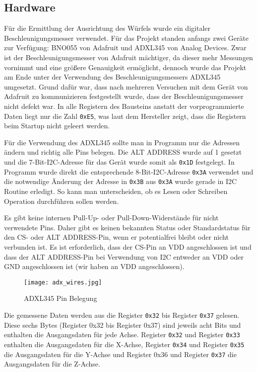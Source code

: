 
\subsection{Hardware}
Für die Ermittlung der Ausrichtung des Würfels wurde ein digitaler Beschleunigungsmesser verwendet. Für das Projekt standen anfangs zwei Geräte zur Verfügung: BNO055 von Adafruit und ADXL345 von Analog Devices. Zwar ist der Beschleunigungsmesser von Adafruit mächtiger, da dieser mehr Messungen vornimmt und eine größere Genauigkeit ermöglicht, dennoch wurde das Projekt am Ende unter der Verwendung des Beschleunigungsmessers ADXL345 umgesetzt. Grund dafür war, dass nach mehreren Versuchen mit dem Gerät von Adafruit zu kommunizieren festgestellt wurde, dass der Beschleunigungsmesser nicht defekt war. In alle Registern des Bausteins anstatt der vorprogrammierte Daten liegt nur die Zahl \texttt{0xE5}, was laut dem Hersteller zeigt, dass die Registern beim Startup nicht geleert werden.

Für die Verwendung des ADXL345 sollte man in Programm nur die Adressen ändern und richtig alle Pins belegen. Die ALT ADDRESS wurde auf 1 gesetzt und die 7-Bit-I2C-Adresse für das Gerät wurde somit als \texttt{0x1D} festgelegt. In Programm wurde direkt die entsprechende 8-Bit-I2C-Adresse \texttt{0x3A} verwendet und die notwendige Änderung der Adresse in \texttt{0x3B} aus \texttt{0x3A} wurde gerade in I2C Routine erledigt. So kann man unterscheiden, ob es Lesen oder Schreiben Operation durchführen sollen werden. 

Es gibt keine internen Pull-Up- oder Pull-Down-Widerstände für nicht verwendete Pins. Daher gibt es keinen bekannten Status oder Standardstatus für den CS- oder ALT ADDRESS-Pin, wenn er potentialfrei bleibt oder nicht verbunden ist. Es ist erforderlich, dass der CS-Pin an VDD  angeschlossen ist und dass der ALT ADDRESS-Pin bei Verwendung von I2C entweder an VDD oder GND angeschlossen ist (wir haben an VDD angeschlossen).

\begin{figure}[!h]
	\centering
	\texttt{[image: adx\_wires.jpg]}
	\caption[AXL345 Pin Belegung]{ADXL345 Pin Belegung}
	\label{fig:i2cwires}
\end{figure}

Die gemessene Daten werden aus die Register \texttt{0x32} bis Register \texttt{0x37} gelesen. Diese sechs Bytes (Register 0x32 bis Register 0x37) sind jeweils acht Bits und enthalten die Ausgangsdaten für jede Achse. Register \texttt{0x32} und Register \texttt{0x33} enthalten die Ausgangsdaten für die X-Achse, Register \texttt{0x34} und Register \texttt{0x35} die Ausgangsdaten für die Y-Achse und Register 0x36 und Register \texttt{0x37} die Ausgangsdaten für die Z-Achse. 


